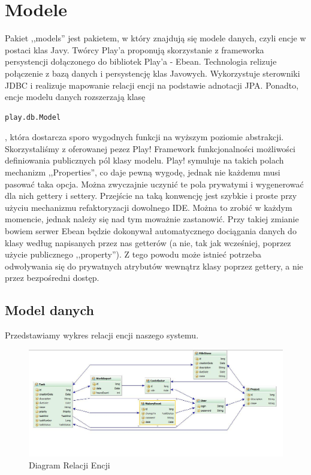 \documentclass[a4paper,12pt,notitlepage]{mwrep}
\begin{document}
\section{Modele}

Pakiet ,,models'' jest pakietem, w który znajdują się modele danych, czyli encje w postaci klas Javy. Twórcy Play'a proponują skorzystanie z 
frameworka persystencji dołączonego do bibliotek Play'a - Ebean. Technologia relizuje połączenie z bazą danych i persystencję klas Javowych. 
Wykorzystuje sterowniki JDBC i realizuje mapowanie relacji encji na podstawie adnotacji JPA. Ponadto, encje modelu danych rozszerzają klasę 
\begin{verbatim}play.db.Model\end{verbatim}, która dostarcza sporo wygodnych funkcji na wyższym poziomie abstrakcji. Skorzystaliśmy z oferowanej 
pezez Play! Framework funkcjonalności możliwości definiowania publicznych pól klasy modelu. Play! symuluje na takich polach mechanizm ,,Properties'', 
co daje pewną wygodę, jednak nie każdemu musi pasować taka opcja. Można zwyczajnie uczynić te pola prywatymi i wygenerować dla nich gettery i settery. 
Przejście na taką konwencję jest szybkie i proste przy użyciu mechanizmu refaktoryzacji dowolnego IDE. Można to zrobić w każdym momencie, jednak 
należy się nad tym moważnie zastanowić. Przy takiej zmianie bowiem serwer Ebean będzie dokonywał automatycznego dociągania danych do klasy według 
napisanych przez nas getterów (a nie, tak jak wcześniej, poprzez użycie publicznego ,,property''). Z tego powodu może istnieć potrzeba odwoływania się 
do prywatnych atrybutów wewnątrz klasy poprzez gettery, a nie przez bezpośredni dostęp.

\subsection{Model danych}

Przedstawiamy wykres relacji encji naszego systemu. \\

\begin{figure}[H]
\centering
\includegraphics[scale=0.6]{images/erd.jpg}
\caption{Diagram Relacji Encji}
\label{fig:erd}
\end{figure}
\end{document}
